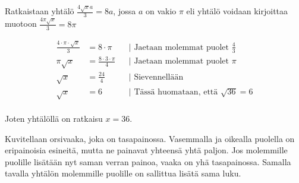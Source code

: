 \begin{esimerkki}
Ratkaistaan yhtälö $\frac{4\sqrt{x}a}{3}=8a$, jossa $a$ on vakio $\pi$ eli yhtälö voidaan kirjoittaa muotoon $\frac{4\pi\sqrt{x}}{3}=8\pi$

		\begin{align*}
			\frac{4 \cdot \pi \cdot \sqrt{x}}{3} &= 8 \cdot {\pi} && \text{| Jaetaan molemmat puolet $\frac{4}{3}$} \\
			{\pi}\sqrt{x} &= \frac{8\cdot 3\cdot {\pi}}{4} && \text{| Jaetaan molemmat puolet $\pi$} \\
			\sqrt{x} &= \frac{24}{4} && \text{| Sievennellään} \\
			\sqrt{x} &= 6 && \text{| Tässä huomataan, että $\sqrt{36}=6$} \\
\end{align*}

Joten yhtälöllä on ratkaisu $x=36$.

\end{esimerkki}

\begin{esimerkki}
	Kuvitellaan orsivaaka, joka on tasapainossa. Vasemmalla ja oikealla puolella on eripainoisia esineitä, mutta ne painavat yhteensä yhtä paljon. Jos molemmille puolille lisätään nyt saman verran painoa, vaaka on yhä tasapainossa. Samalla tavalla yhtälön molemmille puolille on sallittua lisätä sama luku.
\end{esimerkki}

